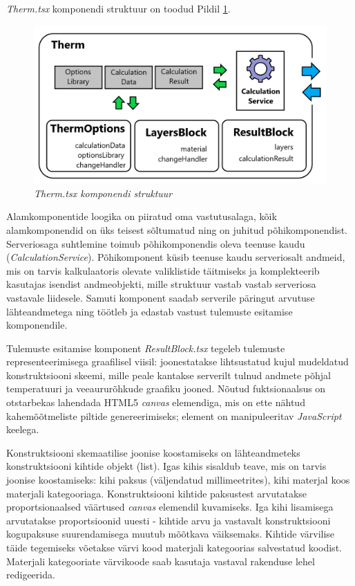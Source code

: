 \textit{Therm.tsx} komponendi struktuur on toodud Pildil \ref{fig:development_frontend_therm}.
\begin{figure}[ht]
    \centering
    \includegraphics[width=1\textwidth]{figures/development/frontend_term_structure.png}
    \caption[Kasutajaliidese komponendi \textit{Therm.tsx} struktuur]{\textit{Therm.tsx komponendi struktuur}}
    \label{fig:development_frontend_therm}
\end{figure}

Alamkomponentide loogika on piiratud oma vastutusalaga, kõik alamkomponendid on üks teisest sõltumatud ning on juhitud põhikomponendist. Serveriosaga suhtlemine toimub põhikomponendis
oleva teenuse kaudu (\textit{CalculationService}). Põhikomponent küsib teenuse kaudu serveriosalt andmeid, mis on tarvis kalkulaatoris olevate valiklistide täitmiseks ja komplekteerib
kasutajas isendist andmeobjekti, mille struktuur vastab vastab serveriosa vastavale liidesele. Samuti komponent saadab serverile päringut arvutuse lähteandmetega ning 
töötleb ja edastab vastust tulemuste esitamise komponendile.

Tulemuste esitamise komponent \textit{ResultBlock.tsx} tegeleb tulemuste representeerimisega graafilisel viisil: joonestatakse lihtsustatud kujul mudeldatud konstruktsiooni skeemi, 
mille peale kantakse serverilt tulnud andmete põhjal temperatuuri ja veeaururõhkude graafiku jooned. Nõutud fuktsionaalsus on otstarbekas lahendada HTML5 \textit{canvas} elemendiga, mis
on ette nähtud kahemõõtmeliste piltide genereerimiseks; element on manipuleeritav \textit{JavaScript} keelega. 

Konstruktsiooni skemaatilise joonise koostamiseks on lähteandmeteks konstruktsiooni kihtide objekt (list). Igas kihis sisaldub teave, mis on tarvis joonise koostamiseks: 
kihi paksus (väljendatud millimeetrites), kihi materjal koos materjali kategooriaga. 
Konstruktsiooni kihtide paksustest arvutatakse proportsionaalsed väärtused \textit{canvas} elemendil kuvamiseks. Iga kihi lisamisega arvutatakse proportsioonid uuesti - kihtide arvu
ja vastavalt konstruktsiooni kogupaksuse suurendamisega muutub mõõtkava väiksemaks. Kihtide värvilise täide tegemiseks võetakse värvi kood materjali kategoorias salvestatud koodist.
Materjali kategooriate värvikoode saab kasutaja vastaval rakenduse lehel redigeerida. 

